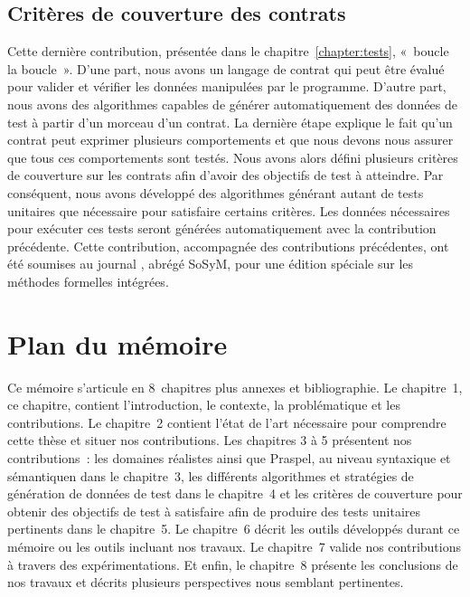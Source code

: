 \subsection{Critères de couverture des contrats}

Cette dernière contribution, présentée dans le chapitre~\ref{chapter:tests},
«~boucle la boucle~». D'une part, nous avons un langage de contrat qui peut être
évalué pour valider et vérifier les données manipulées par le programme. D'autre
part, nous avons des algorithmes capables de générer automatiquement des données
de test à partir d'un morceau d'un contrat. La dernière étape explique le fait
qu'un contrat peut exprimer plusieurs comportements et que nous devons nous
assurer que tous ces comportements sont testés. Nous avons alors défini
plusieurs critères de couverture sur les contrats afin d'avoir des objectifs de
test à atteindre. Par conséquent, nous avons développé des algorithmes générant
autant de tests unitaires que nécessaire pour satisfaire certains critères. Les
données nécessaires pour exécuter ces tests seront générées automatiquement avec
la contribution précédente. Cette contribution, accompagnée des contributions
précédentes, ont été soumises au journal , abrégé SoSyM, pour une édition spéciale sur les méthodes formelles
intégrées.

\section{Plan du mémoire}

Ce mémoire s'articule en 8~chapitres plus annexes et bibliographie.  Le
chapitre~1, ce chapitre, contient l'introduction, le contexte, la problématique
et les contributions. Le chapitre~2 contient l'état de l'art nécessaire pour
comprendre cette thèse et situer nos contributions. Les chapitres 3 à 5
présentent nos contributions~: les domaines réalistes ainsi que Praspel, au
niveau syntaxique et sémantiquen dans le chapitre~3, les différents algorithmes
et stratégies de génération de données de test dans le chapitre~4 et les
critères de couverture pour obtenir des objectifs de test à satisfaire afin de
produire des tests unitaires pertinents dans le chapitre~5. Le chapitre~6 décrit
les outils développés durant ce mémoire ou les outils incluant nos travaux. Le
chapitre~7 valide nos contributions à travers des expérimentations. Et enfin, le
chapitre~8 présente les conclusions de nos travaux et décrits plusieurs
perspectives nous semblant pertinentes.
